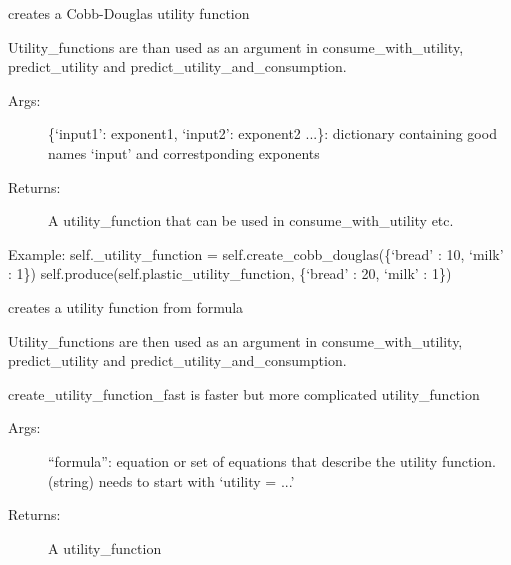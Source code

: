 \documentclass[letterpaper,10pt,english]{sphinxmanual}
\begin{document}
\begin{fulllineitems}
\begin{fulllineitems}
\end{fulllineitems}


\begin{fulllineitems}
\label{Household:abce.Household.set_cobb_douglas_utility_function}
creates a Cobb-Douglas utility function

Utility\_functions are than used as an argument in consume\_with\_utility,
predict\_utility and predict\_utility\_and\_consumption.
\begin{description}
\item[{Args:}] \leavevmode
\{`input1': exponent1, `input2': exponent2 ...\}: dictionary
containing good names `input' and correstponding exponents

\item[{Returns:}] \leavevmode
A utility\_function that can be used in consume\_with\_utility etc.

\end{description}

Example:
self.\_utility\_function = self.create\_cobb\_douglas(\{`bread' : 10, `milk' : 1\})
self.produce(self.plastic\_utility\_function, \{`bread' : 20, `milk' : 1\})

\end{fulllineitems}


\begin{fulllineitems}
\label{Household:abce.Household.set_utility_function}
creates a utility function from formula

Utility\_functions are then used as an argument in consume\_with\_utility,
predict\_utility and predict\_utility\_and\_consumption.

create\_utility\_function\_fast is faster but more complicated utility\_function
\begin{description}
\item[{Args:}] \leavevmode
``formula'': equation or set of equations that describe the
utility function. (string) needs to start with `utility = ...'

\item[{Returns:}] \leavevmode
A utility\_function


\end{description}
\end{fulllineitems}
\end{fulllineitems}
\end{document}
